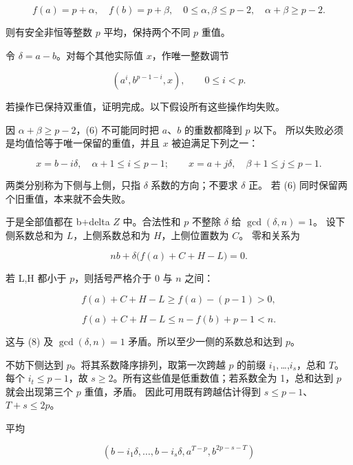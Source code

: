 \[
f(a)=p+\alpha,\quad f(b)=p+\beta,\quad
0\le\alpha,\beta\le p-2,\quad\alpha+\beta\ge p-2.
\tag{C4.5}
\]

{则有安全非恒等整数} {\ensuremath{p}} {平均，保持两个不同} {\ensuremath{p}} {重值。}

{令} {\ensuremath{\delta =a-b}。对每个其他实际值} {\ensuremath{x}，作唯一整数调节}

\[
(a^i,b^{p-1-i},x),\qquad0\le i<p.
\tag{C4.6}
\]

{若操作已保持双重值，证明完成。以下假设所有这些操作均失败。}

{因} {\ensuremath{\alpha +\beta \ge p-2}，(6)} {不可能同时把} {\ensuremath{a}、\ensuremath{b}} {的重数都降到} {\ensuremath{p}} {以下。} {所以失败必须是均值恰等于唯一保留的重值，并且} {\ensuremath{x}} {被迫满足下列之一：}

\[
x=b-i\delta,\quad\alpha+1\le i\le p-1;
\qquad
x=a+j\delta,\quad\beta+1\le j\le p-1.
\tag{C4.7}
\]

{两类分别称为下侧与上侧，只指} {\ensuremath{\delta }} {系数的方向；不要求} {\ensuremath{\delta }} {正。} {若} {(6)} {同时保留两个旧重值，本来就不会失败。}

{于是全部值都在} {b+delta} {\ensuremath{Z}} {中。合法性和} {\ensuremath{p}} {不整除} {\ensuremath{\delta }} {给} {\ensuremath{\operatorname{gcd}(\delta ,n)=1}。} {设下侧系数总和为} {\ensuremath{L}，上侧系数总和为} {\ensuremath{H}，上侧位置数为} {\ensuremath{C}。} {零和关系为}

\[
nb+\delta\bigl(f(a)+C+H-L\bigr)=0.
\tag{C4.8}
\]

{若} {L,H} {都小于} {\ensuremath{p}，则括号严格介于} {0} {与} {\ensuremath{n}} {之间：}

\[
f(a)+C+H-L\ge f(a)-(p-1)>0,
\]

\[
f(a)+C+H-L\le n-f(b)+p-1<n.
\]

{这与} {(8)} {及} {\ensuremath{\operatorname{gcd}(\delta ,n)=1}} {矛盾。所以至少一侧的系数总和达到} {\ensuremath{p}。}

{不妨下侧达到} {\ensuremath{p}。将其系数降序排列，取第一次跨越} {\ensuremath{p}} {的前缀} {\ensuremath{i_{1},}\ldots,\ensuremath{i_{s}}，总和} {\ensuremath{T}。} {每个} {\ensuremath{i_{t}\le p-1}，故} {\ensuremath{s\ge 2}。所有这些值是低重数值；若系数全为} {1，总和达到} {\ensuremath{p}} {就会出现第三个} {\ensuremath{p}} {重值，矛盾。} {因此可用既有跨越估计得到} {\ensuremath{s\le p-1}、\ensuremath{T+s\le 2p}。}

{平均}

\[
\boxed{(b-i_1\delta,\ldots,b-i_s\delta,
a^{T-p},b^{2p-s-T})}
\tag{C4.9}
\]

